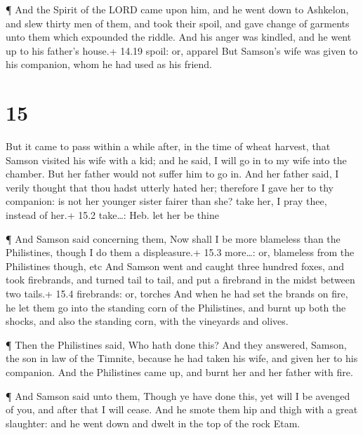  ¶ And the Spirit of the LORD came upon him, and he went
down to Ashkelon, and slew thirty men of them, and took their spoil, and
gave change of garments unto them which expounded the riddle. And his
anger was kindled, and he went up to his father's house.+ 14.19 spoil:
or, apparel  But Samson's wife was given to his companion,
whom he had used as his friend.

\hypertarget{section-14}{%
\section{15}\label{section-14}}

 But it came to pass within a while after, in the time of
wheat harvest, that Samson visited his wife with a kid; and he said, I
will go in to my wife into the chamber. But her father would not suffer
him to go in.  And her father said, I verily thought that
thou hadst utterly hated her; therefore I gave her to thy companion: is
not her younger sister fairer than she? take her, I pray thee, instead
of her.+ 15.2 take\ldots: Heb. let her be thine

 ¶ And Samson said concerning them, Now shall I be more
blameless than the Philistines, though I do them a displeasure.+ 15.3
more\ldots: or, blameless from the Philistines though, etc 
And Samson went and caught three hundred foxes, and took firebrands, and
turned tail to tail, and put a firebrand in the midst between two
tails.+ 15.4 firebrands: or, torches  And when he had set
the brands on fire, he let them go into the standing corn of the
Philistines, and burnt up both the shocks, and also the standing corn,
with the vineyards and olives.

 ¶ Then the Philistines said, Who hath done this? And they
answered, Samson, the son in law of the Timnite, because he had taken
his wife, and given her to his companion. And the Philistines came up,
and burnt her and her father with fire.

 ¶ And Samson said unto them, Though ye have done this, yet
will I be avenged of you, and after that I will cease.  And
he smote them hip and thigh with a great slaughter: and he went down and
dwelt in the top of the rock Etam.

